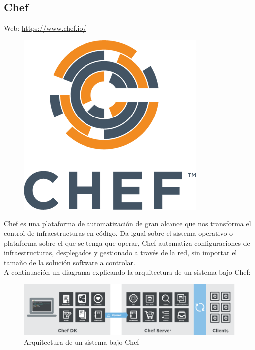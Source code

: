 \subsection{Chef}
Web: \url{https://www.chef.io/}\\
\begin{figure}[H]
  \begin{center}
    \includegraphics[scale=0.3]{diagramas/chef-logo.png}
  \end{center}
\end{figure}

Chef es una plataforma de automatización de gran alcance que nos transforma el control de infraestructuras en código. Da igual sobre el sistema operativo o plataforma sobre el que se tenga que operar, Chef automatiza configuraciones de infraestructuras, desplegados y gestionado a través de la red, sin importar el tamaño de la solución software a controlar.\\

A continuación un diagrama explicando la arquitectura de un sistema bajo Chef:

\begin{figure}[H]
  \begin{center}
  \includegraphics[scale=1]{diagramas/chef.png}
  \caption{Arquitectura de un sistema bajo Chef}
  \end{center}
\end{figure}


